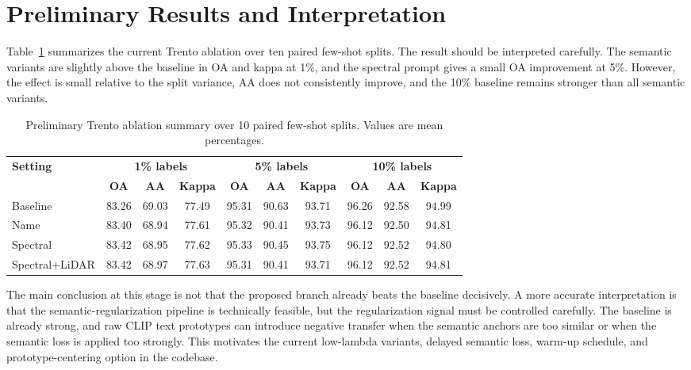 \documentclass[10pt,journal,compsoc]{IEEEtran}
\begin{document}
\section{Preliminary Results and Interpretation}

Table~\ref{tab:prelim_trento} summarizes the current Trento ablation over ten paired few-shot splits. The result should be interpreted carefully. The semantic variants are slightly above the baseline in OA and kappa at 1\%, and the spectral prompt gives a small OA improvement at 5\%. However, the effect is small relative to the split variance, AA does not consistently improve, and the 10\% baseline remains stronger than all semantic variants.

\begin{table}[t]
\centering
\caption{Preliminary Trento ablation summary over 10 paired few-shot splits. Values are mean percentages.}
\label{tab:prelim_trento}
\begin{tabular}{lccccccccc}
\toprule
\multirow{2}{*}{\textbf{Setting}} & \multicolumn{3}{c}{\textbf{1\% labels}} & \multicolumn{3}{c}{\textbf{5\% labels}} & \multicolumn{3}{c}{\textbf{10\% labels}} \\
\cmidrule(lr){2-4}\cmidrule(lr){5-7}\cmidrule(lr){8-10}
 & \textbf{OA} & \textbf{AA} & \textbf{Kappa} & \textbf{OA} & \textbf{AA} & \textbf{Kappa} & \textbf{OA} & \textbf{AA} & \textbf{Kappa} \\
\midrule
Baseline & 83.26 & 69.03 & 77.49 & 95.31 & 90.63 & 93.71 & 96.26 & 92.58 & 94.99 \\
Name & 83.40 & 68.94 & 77.61 & 95.32 & 90.41 & 93.73 & 96.12 & 92.50 & 94.81 \\
Spectral & 83.42 & 68.95 & 77.62 & 95.33 & 90.45 & 93.75 & 96.12 & 92.52 & 94.80 \\
Spectral+LiDAR & 83.42 & 68.97 & 77.63 & 95.31 & 90.41 & 93.71 & 96.12 & 92.52 & 94.81 \\
\bottomrule
\end{tabular}
\end{table}

The main conclusion at this stage is not that the proposed branch already beats the baseline decisively. A more accurate interpretation is that the semantic-regularization pipeline is technically feasible, but the regularization signal must be controlled carefully. The baseline is already strong, and raw CLIP text prototypes can introduce negative transfer when the semantic anchors are too similar or when the semantic loss is applied too strongly. This motivates the current low-lambda variants, delayed semantic loss, warm-up schedule, and prototype-centering option in the codebase.
\end{document}

